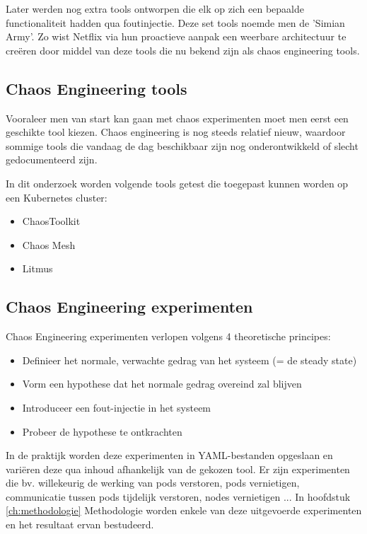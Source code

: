 Later werden nog extra tools ontworpen die elk op zich een bepaalde functionaliteit hadden qua foutinjectie. Deze set tools noemde men de 'Simian Army'. Zo wist Netflix via hun proactieve aanpak een weerbare architectuur te creëren door middel van deze tools die nu bekend zijn als chaos engineering tools.

\subsection{Chaos Engineering tools}

Vooraleer men van start kan gaan met chaos experimenten moet men eerst een geschikte tool kiezen. Chaos engineering is nog steeds relatief nieuw, waardoor sommige tools die vandaag de dag beschikbaar zijn nog onderontwikkeld of slecht gedocumenteerd zijn.

In dit onderzoek worden volgende tools getest die toegepast kunnen worden op een Kubernetes cluster: 
\begin{itemize}
    \item ChaosToolkit
    \item Chaos Mesh
    \item Litmus
\end{itemize} 

\subsection{Chaos Engineering experimenten}

Chaos Engineering experimenten verlopen volgens 4 theoretische principes: 
\begin{itemize}
    \item Definieer het normale, verwachte gedrag van het systeem (= de steady state)
    \item Vorm een hypothese dat het normale gedrag overeind zal blijven 
    \item Introduceer een fout-injectie in het systeem
    \item Probeer de hypothese te ontkrachten
\end{itemize}

In de praktijk worden deze experimenten in YAML-bestanden opgeslaan en variëren deze qua inhoud afhankelijk van de gekozen tool. Er zijn experimenten die bv. willekeurig de werking van pods verstoren, pods vernietigen, communicatie tussen pods tijdelijk verstoren, nodes vernietigen ... In hoofdstuk \ref{ch:methodologie} Methodologie worden enkele van deze uitgevoerde experimenten en het resultaat ervan bestudeerd. 

